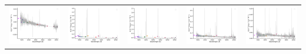 \begin{center}
\begin{longtable}{l l l l l }
    \includegraphics[width=0.2\linewidth, clip]{Figs/Figs-sdss/spec-1085-52531-0175-STRIPE82-0017-027488.pdf} & \includegraphics[width=0.2\linewidth, clip]{Figs/Figs-sdss/spec-1089-52913-0196-STRIPE82-0007-024265.pdf} & \includegraphics[width=0.2\linewidth, clip]{Figs/Figs-sdss/spec-1089-52913-0199-STRIPE82-0007-023673.pdf} & \includegraphics[width=0.2\linewidth, clip]{Figs/Figs-sdss/spec-1089-52913-0386-STRIPE82-0006-034786.pdf} & \includegraphics[width=0.2\linewidth, clip]{Figs/Figs-sdss/spec-1090-52903-0539-STRIPE82-0006-015081.pdf} \\

\end{longtable}
\end{center}
